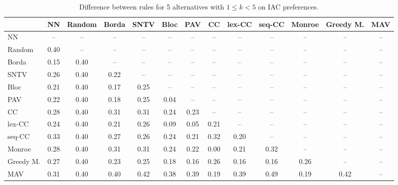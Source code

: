 
\begin{table*}[htbp]
\centering
\begin{tabular}{lcccccccccccc}
\toprule
 & NN & Random & Borda & SNTV & Bloc & PAV & CC & lex-CC & seq-CC & Monroe & Greedy M. & MAV \\
\midrule
NN & -- & -- & -- & -- & -- & -- & -- & -- & -- & -- & -- & -- \\
Random & \cellcolor{blue!40} 0.40 & -- & -- & -- & -- & -- & -- & -- & -- & -- & -- & -- \\
Borda & \cellcolor{blue!15} 0.15 & \cellcolor{blue!40} 0.40 & -- & -- & -- & -- & -- & -- & -- & -- & -- & -- \\
SNTV & \cellcolor{blue!26} 0.26 & \cellcolor{blue!40} 0.40 & \cellcolor{blue!22} 0.22 & -- & -- & -- & -- & -- & -- & -- & -- & -- \\
Bloc & \cellcolor{blue!21} 0.21 & \cellcolor{blue!40} 0.40 & \cellcolor{blue!17} 0.17 & \cellcolor{blue!25} 0.25 & -- & -- & -- & -- & -- & -- & -- & -- \\
PAV & \cellcolor{blue!22} 0.22 & \cellcolor{blue!40} 0.40 & \cellcolor{blue!18} 0.18 & \cellcolor{blue!25} 0.25 & \cellcolor{blue!4} 0.04 & -- & -- & -- & -- & -- & -- & -- \\
CC & \cellcolor{blue!28} 0.28 & \cellcolor{blue!40} 0.40 & \cellcolor{blue!31} 0.31 & \cellcolor{blue!31} 0.31 & \cellcolor{blue!24} 0.24 & \cellcolor{blue!23} 0.23 & -- & -- & -- & -- & -- & -- \\
lex-CC & \cellcolor{blue!24} 0.24 & \cellcolor{blue!40} 0.40 & \cellcolor{blue!21} 0.21 & \cellcolor{blue!26} 0.26 & \cellcolor{blue!9} 0.09 & \cellcolor{blue!5} 0.05 & \cellcolor{blue!21} 0.21 & -- & -- & -- & -- & -- \\
seq-CC & \cellcolor{blue!33} 0.33 & \cellcolor{blue!40} 0.40 & \cellcolor{blue!27} 0.27 & \cellcolor{blue!26} 0.26 & \cellcolor{blue!24} 0.24 & \cellcolor{blue!21} 0.21 & \cellcolor{blue!32} 0.32 & \cellcolor{blue!20} 0.20 & -- & -- & -- & -- \\
Monroe & \cellcolor{blue!28} 0.28 & \cellcolor{blue!40} 0.40 & \cellcolor{blue!31} 0.31 & \cellcolor{blue!31} 0.31 & \cellcolor{blue!24} 0.24 & \cellcolor{blue!22} 0.22 & \cellcolor{blue!0} 0.00 & \cellcolor{blue!21} 0.21 & \cellcolor{blue!32} 0.32 & -- & -- & -- \\
Greedy M. & \cellcolor{blue!27} 0.27 & \cellcolor{blue!40} 0.40 & \cellcolor{blue!23} 0.23 & \cellcolor{blue!25} 0.25 & \cellcolor{blue!18} 0.18 & \cellcolor{blue!16} 0.16 & \cellcolor{blue!26} 0.26 & \cellcolor{blue!16} 0.16 & \cellcolor{blue!16} 0.16 & \cellcolor{blue!26} 0.26 & -- & -- \\
MAV & \cellcolor{blue!31} 0.31 & \cellcolor{blue!40} 0.40 & \cellcolor{blue!40} 0.40 & \cellcolor{blue!42} 0.42 & \cellcolor{blue!38} 0.38 & \cellcolor{blue!39} 0.39 & \cellcolor{blue!19} 0.19 & \cellcolor{blue!39} 0.39 & \cellcolor{blue!49} 0.49 & \cellcolor{blue!19} 0.19 & \cellcolor{blue!42} 0.42 & -- \\
\bottomrule
\end{tabular}

\caption{Difference between rules for 5 alternatives with $1 \leq k < 5$ on IAC preferences.}
\label{tab:rule_distance_heatmap-m=[5]-pref_dist=IAC}
\end{table*}
    
